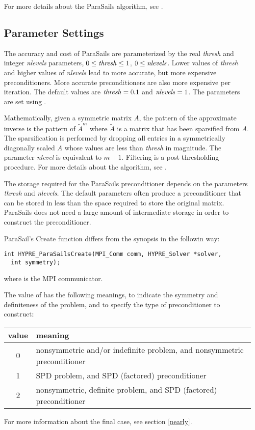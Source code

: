 For more details about the ParaSails algorithm, see \cite{EChow_2000}.


\subsection{Parameter Settings}

The accuracy and cost of ParaSails are parameterized by the real {\em thresh}
and integer {\em nlevels} parameters,
$0 \le {\it thresh} \le 1$, $0 \le {\it nlevels}$.
Lower values of {\em thresh}
and higher values of {\em nlevels} lead to more accurate, but more expensive
preconditioners.  More accurate preconditioners are also more expensive
per iteration.  The default values are ${\it thresh} = 0.1$
and ${\it nlevels} = 1$.  The parameters are set using
.

Mathematically, given a symmetric matrix $A$, the pattern of the
approximate inverse is the pattern of $\tilde{A}^m$ where $\tilde{A}$
is a matrix that has been sparsified from $A$.  The sparsification
is performed by dropping all entries in a symmetrically diagonally scaled $A$
whose values are less than {\em thresh} in magnitude.  The parameter
{\em nlevel} is equivalent to $m+1$.
Filtering is a post-thresholding procedure.
For more details about the algorithm, see \cite{EChow_2000}.

The storage required for the ParaSails preconditioner depends on
the parameters {\em thresh} and {\em nlevels}.  The default parameters
often produce a preconditioner that can be stored in less than the
space required to store the original matrix.
ParaSails does not need a large amount of intermediate storage in
order to construct the preconditioner.


ParaSail's Create function differs from the synopsis in the followin way:

\begin{display}
\begin{verbatim}
int HYPRE_ParaSailsCreate(MPI_Comm comm, HYPRE_Solver *solver,
  int symmetry);
\end{verbatim}
\end{display}
where  is the MPI communicator.

The value of  has the following meanings, to indicate
the symmetry and definiteness of the problem, and to specify the 
type of preconditioner to construct:
\begin{center}
\begin{tabular}{|c|l|} \hline
value & meaning \\ \hline
0 & nonsymmetric and/or indefinite problem, and nonsymmetric preconditioner \\
1 & SPD problem, and SPD (factored) preconditioner \\
2 & nonsymmetric, definite problem, and SPD (factored) preconditioner \\ 
\hline
\end{tabular}
\end{center}
For more information about the final case, see section \ref{nearly}.

